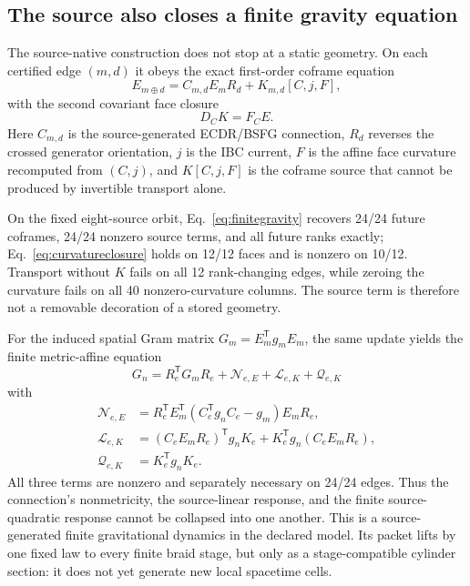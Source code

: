 \documentclass[11pt]{article}
\theoremstyle{definition}
\theoremstyle{remark}
\begin{document}
\subsection{The source also closes a finite gravity equation}

The source-native construction does not stop at a static geometry. On each certified edge $(m,d)$ it obeys the exact first-order coframe equation
\begin{equation}\label{eq:finitegravity}
 E_{m\oplus d}=C_{m,d}E_mR_d+K_{m,d}[C,j,F],
\end{equation}
with the second covariant face closure
\begin{equation}\label{eq:curvatureclosure}
 D_CK=F_CE.
\end{equation}
Here $C_{m,d}$ is the source-generated ECDR/BSFG connection, $R_d$ reverses the crossed generator orientation, $j$ is the IBC current, $F$ is the affine face curvature recomputed from $(C,j)$, and $K[C,j,F]$ is the coframe source that cannot be produced by invertible transport alone.

On the fixed eight-source orbit, Eq.~\eqref{eq:finitegravity} recovers 24/24 future coframes, 24/24 nonzero source terms, and all future ranks exactly; Eq.~\eqref{eq:curvatureclosure} holds on 12/12 faces and is nonzero on 10/12. Transport without $K$ fails on all 12 rank-changing edges, while zeroing the curvature fails on all 40 nonzero-curvature columns. The source term is therefore not a removable decoration of a stored geometry.

For the induced spatial Gram matrix $G_m=E_m^{\mathsf T}g_mE_m$, the same update yields the finite metric-affine equation
\begin{equation}\label{eq:metricaffinegravity}
 \boxed{
 G_n=R_e^{\mathsf T}G_mR_e
 +\mathcal N_{e,E}+\mathcal L_{e,K}+\mathcal Q_{e,K}}
\end{equation}
with
\begin{align}
 \mathcal N_{e,E}
 &=R_e^{\mathsf T}E_m^{\mathsf T}
   (C_e^{\mathsf T}g_nC_e-g_m)E_mR_e,\\
 \mathcal L_{e,K}
 &=(C_eE_mR_e)^{\mathsf T}g_nK_e
   +K_e^{\mathsf T}g_n(C_eE_mR_e),\\
 \mathcal Q_{e,K}&=K_e^{\mathsf T}g_nK_e.
\end{align}
All three terms are nonzero and separately necessary on 24/24 edges. Thus the connection's nonmetricity, the source-linear response, and the finite source-quadratic response cannot be collapsed into one another. This is a source-generated finite gravitational dynamics in the declared model. Its packet lifts by one fixed law to every finite braid stage, but only as a stage-compatible cylinder section: it does not yet generate new local spacetime cells.
\end{document}
